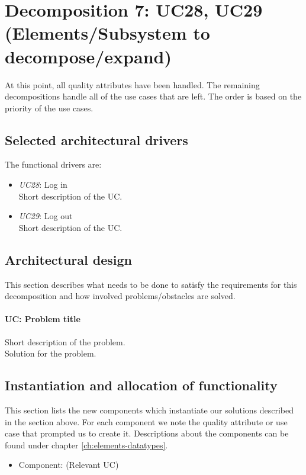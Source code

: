 \section{Decomposition 7: UC28, UC29 (Elements/Subsystem to decompose/expand)}
    At this point, all quality attributes have been handled. The remaining
    decompositions handle all of the use cases that are left. The order
    is based on the priority of the use cases.


\subsection{Selected architectural drivers}
    The functional drivers are:
    \begin{itemize}
        \item \emph{UC28}: Log in \\
              Short description of the UC.
        \item \emph{UC29}: Log out \\
              Short description of the UC.
    \end{itemize}


\subsection{Architectural design}
    This section describes what needs to be done to satisfy the requirements for
    this decomposition and how involved problems/obstacles are solved.

    \paragraph{UC: Problem title}
        Short description of the problem.\\
        Solution for the problem.


\subsection{Instantiation and allocation of functionality}
    This section lists the new components which instantiate our solutions
    described in the section above. For each component we note the quality
    attribute or use case that prompted us to create it. Descriptions about
    the components can be found under chapter \ref{ch:elements-datatypes}. \\

    \begin{itemize}
        \item Component: (Relevant UC)
    \end{itemize}



